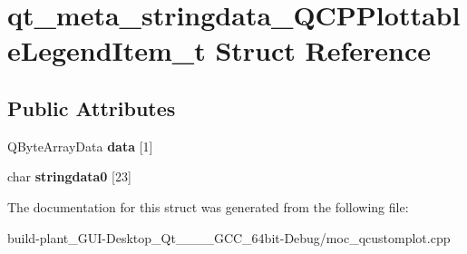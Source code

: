 \hypertarget{structqt__meta__stringdata__QCPPlottableLegendItem__t}{}\section{qt\+\_\+meta\+\_\+stringdata\+\_\+\+Q\+C\+P\+Plottable\+Legend\+Item\+\_\+t Struct Reference}
\label{structqt__meta__stringdata__QCPPlottableLegendItem__t}
\subsection*{Public Attributes}
\begin{DoxyCompactItemize}
\item 
\mbox{\label{structqt__meta__stringdata__QCPPlottableLegendItem__t_a56d928faacdea012d9b501b879ef98a8}} 
Q\+Byte\+Array\+Data {\bfseries data} \mbox{[}1\mbox{]}
\item 
\mbox{\label{structqt__meta__stringdata__QCPPlottableLegendItem__t_a2add548f134b64b363d6ee1b2125da1d}} 
char {\bfseries stringdata0} \mbox{[}23\mbox{]}
\end{DoxyCompactItemize}


The documentation for this struct was generated from the following file\+:\begin{DoxyCompactItemize}
\item 
build-\/plant\+\_\+\+G\+U\+I-\/\+Desktop\+\_\+\+Qt\+\_\+\_\+\_\+\_\+\+G\+C\+C\+\_\+64bit-\/\+Debug/moc\+\_\+qcustomplot.\+cpp\end{DoxyCompactItemize}
